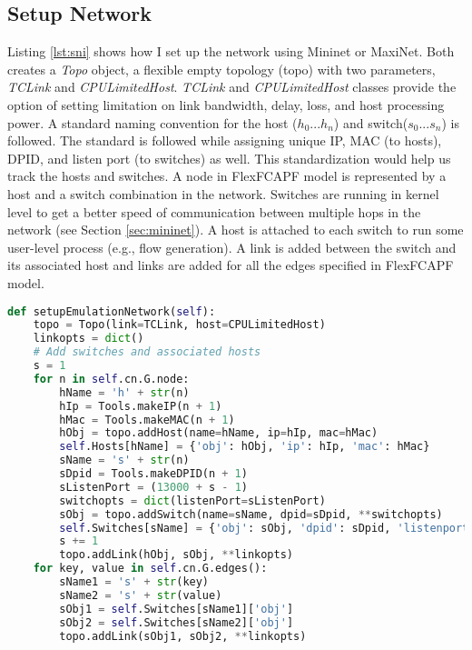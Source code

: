\subsection{Setup Network}\label{sec:setnet}
Listing \ref{lst:sni} shows how I set up the network using Mininet or MaxiNet. Both creates a \textit{Topo} object, a flexible empty topology (topo) with two parameters, \textit{TCLink} and \textit{CPULimitedHost}. \textit{TCLink} and \textit{CPULimitedHost} classes provide the option of setting limitation on link bandwidth, delay, loss, and host processing power. A standard naming convention for the host ($h_0 ... h_n$) and switch($s_0 ... s_n$) is followed. The standard is followed while assigning unique IP, MAC (to hosts), DPID, and listen port (to switches) as well. This standardization would help us track the hosts and switches. A node in FlexFCAPF model is represented by a host and a switch combination in the network. Switches are running in kernel level to get a better speed of communication between multiple hops in the network (see Section \ref{sec:mininet}). A host is attached to each switch to run some user-level process (e.g., flow generation). A link is added between the switch and its associated host and links are added for all the edges specified in FlexFCAPF model.
\begin{lstlisting}[caption={Setup network implementation},label={lst:sni},language=Python,tabsize=2,basicstyle=\footnotesize,breaklines=true, showspaces=false,showstringspaces=false,showtabs=false,frame=single]
def setupEmulationNetwork(self):
	topo = Topo(link=TCLink, host=CPULimitedHost)
	linkopts = dict()
	# Add switches and associated hosts
	s = 1
	for n in self.cn.G.node:
		hName = 'h' + str(n)
		hIp = Tools.makeIP(n + 1)
		hMac = Tools.makeMAC(n + 1)
		hObj = topo.addHost(name=hName, ip=hIp, mac=hMac)
		self.Hosts[hName] = {'obj': hObj, 'ip': hIp, 'mac': hMac}
		sName = 's' + str(n)
		sDpid = Tools.makeDPID(n + 1)
		sListenPort = (13000 + s - 1)
		switchopts = dict(listenPort=sListenPort)
		sObj = topo.addSwitch(name=sName, dpid=sDpid, **switchopts)
		self.Switches[sName] = {'obj': sObj, 'dpid': sDpid, 'listenport': sListenPort}
		s += 1
		topo.addLink(hObj, sObj, **linkopts)
	for key, value in self.cn.G.edges():
		sName1 = 's' + str(key)
		sName2 = 's' + str(value)
		sObj1 = self.Switches[sName1]['obj']
		sObj2 = self.Switches[sName2]['obj']
		topo.addLink(sObj1, sObj2, **linkopts)
\end{lstlisting}

